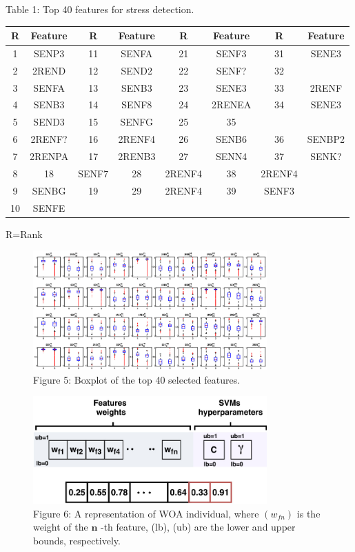 \documentclass{article}
\begin{document}
Table 1: Top 40 features for stress detection.


\begin{tabular}{|c|c|c|c|c|c|c|c|}\hline
R & Feature & R & Feature & R & Feature & R & Feature \\ \hline
1 & SENP3 & 11 & SENFA & 21 & SENF3 & 31 & SENE3 \\ \hline
2 & 2REND & 12 & SEND2 & 22 & SENF? & 32 &  \\ \hline
3 & SENFA & 13 & SENB3 & 23 & SENE3 & 33 & 2RENF \\ \hline
4 & SENB3 & 14 & SENF8 & 24 & 2RENEA & 34 & SENE3 \\ \hline
5 & SEND3 & 15 & SENFG & 25 & 35 &  &  \\ \hline
6 & 2RENF? & 16 & 2RENF4 & 26 & SENB6 & 36 & SENBP2 \\ \hline
7 & 2RENPA & 17 & 2RENB3 & 27 & SENN4 & 37 & SENK? \\ \hline
8 & 18 & SENF7 & 28 & 2RENF4 & 38 & 2RENF4 &  \\ \hline
9 & SENBG & 19 & 29 & 2RENF4 & 39 & SENF3 &  \\ \hline
10 & SENFE &  &  &  &  &  &  \\ \hline
\end{tabular}
R=Rank


\begin{figure}[htbp]
\centering
\includegraphics[width=0.8\textwidth]{images/a41c606205bf7eabfb56a60f2b4aef6e7e8c01c8fbc8cfcdeea8bca520e5cf96.jpg}
\caption{Figure 5: Boxplot of the top 40 selected features.}
\end{figure}


\begin{figure}[htbp]
\centering
\includegraphics[width=0.8\textwidth]{images/7746e4b64e7a5067b8e62ecd8847e1dd076ae501b3346b678df26ce7efb7aa2e.jpg}
\caption{Figure 6: A representation of WOA individual, where $(w_{f n})$ is the weight of the $\mathbf{n}$ -th feature, (lb), (ub) are the lower and upper bounds, respectively.}
\end{figure}
\end{document}
